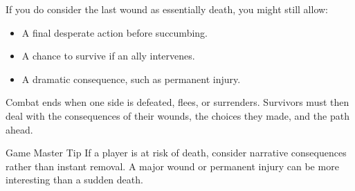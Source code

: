 If you do consider the last wound as essentially death, you might still allow:
\begin{itemize}
    \item A final desperate action before succumbing.
    \item A chance to survive if an ally intervenes.
    \item A dramatic consequence, such as permanent injury.
\end{itemize}

Combat ends when one side is defeated, flees, or surrenders. Survivors must then deal with the consequences of their wounds, the choices they made, and the path ahead.

\begin{DndComment}{Game Master Tip}
If a player is at risk of death, consider narrative consequences rather than instant removal. A major wound or permanent injury can be more interesting than a sudden death.
\end{DndComment}

